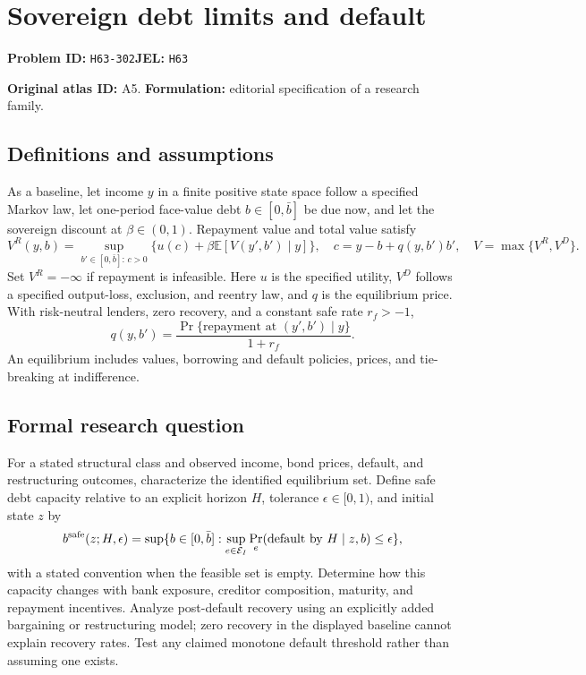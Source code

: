 \documentclass[11pt,a4paper]{article}
\begin{document}
\section*{Sovereign debt limits and default}
\textbf{Problem ID:} \texttt{H63-302}\quad \textbf{JEL:} \texttt{H63}\par
\label{problem:OP-0015}
\label{atlas:prob:A5}

\noindent\textbf{Original atlas ID:} A5. \textbf{Formulation:} editorial specification of a research family.

\subsection*{Definitions and assumptions}

As a baseline, let income $y$ in a finite positive state space follow a specified Markov law, let one-period face-value debt $b\in[0,\bar b]$ be due now, and let the sovereign discount at $\beta\in(0,1)$. Repayment value and total value satisfy
\[
V^R(y,b)=\sup_{b'\in[0,\bar b]:\,c>0}
 \{u(c)+\beta\mathbb E[V(y',b')\mid y]\},\quad
c=y-b+q(y,b')b',\quad V=\max\{V^R,V^D\}.
\]
Set $V^R=-\infty$ if repayment is infeasible. Here $u$ is the specified utility, $V^D$ follows a specified output-loss, exclusion, and reentry law, and $q$ is the equilibrium price. With risk-neutral lenders, zero recovery, and a constant safe rate $r_f>-1$,
\[
q(y,b')=\frac{\Pr\{\text{repayment at }(y',b')\mid y\}}{1+r_f}.
\]
An equilibrium includes values, borrowing and default policies, prices, and tie-breaking at indifference.

\subsection*{Formal research question}

For a stated structural class and observed income, bond prices, default, and restructuring outcomes, characterize the identified equilibrium set. Define safe debt capacity relative to an explicit horizon $H$, tolerance $\epsilon\in[0,1)$, and initial state $z$ by
\[
b^{\rm safe}(z;H,\epsilon)=\sup\{b\in[0,\bar b]:
 \sup_{e\in\mathcal E_I}\Pr_e(\text{default by }H\mid z,b)\le\epsilon\},
\]
with a stated convention when the feasible set is empty. Determine how this capacity changes with bank exposure, creditor composition, maturity, and repayment incentives. Analyze post-default recovery using an explicitly added bargaining or restructuring model; zero recovery in the displayed baseline cannot explain recovery rates. Test any claimed monotone default threshold rather than assuming one exists.
\end{document}
